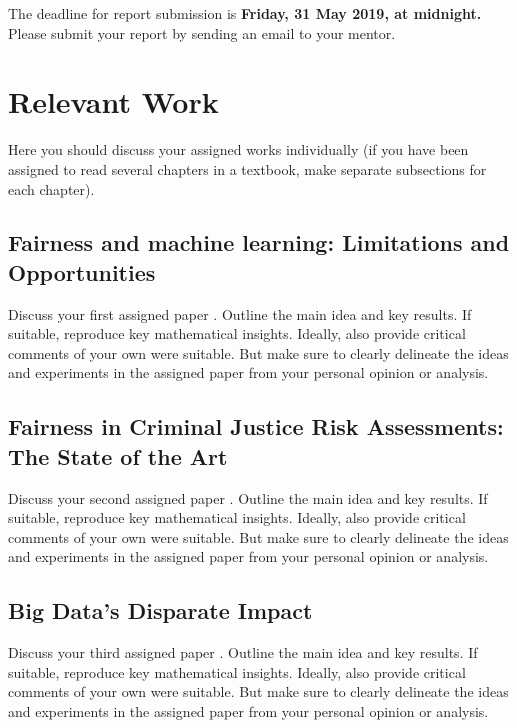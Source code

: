 \documentclass{article}
\begin{document}
\begin{center}
The deadline for report submission is \textbf{Friday, 31 May 2019, at midnight.}\\
Please submit your report by sending an email to your mentor.
\end{center}

\section{Relevant Work}

Here you should discuss your assigned works individually (if you have been assigned to read several chapters in a textbook, make separate subsections for each chapter).

\subsection{Fairness and machine learning: Limitations and Opportunities}

Discuss your first assigned paper \cite{barocas-hardt-narayanan}. Outline the main idea and key results. If suitable, reproduce key mathematical insights. Ideally, also provide critical comments of your own were suitable. But make sure to clearly delineate the ideas and experiments in the assigned paper from your personal opinion or analysis.

\subsection{Fairness in Criminal Justice Risk Assessments: The State of the Art}

Discuss your second assigned paper \cite{Berk.2018}. Outline the main idea and key results. If suitable, reproduce key mathematical insights. Ideally, also provide critical comments of your own were suitable. But make sure to clearly delineate the ideas and experiments in the assigned paper from your personal opinion or analysis.

\subsection{Big Data’s Disparate Impact}

Discuss your third assigned paper \cite{Barocas.2016}. Outline the main idea and key results. If suitable, reproduce key mathematical insights. Ideally, also provide critical comments of your own were suitable. But make sure to clearly delineate the ideas and experiments in the assigned paper from your personal opinion or analysis.
\end{document}
